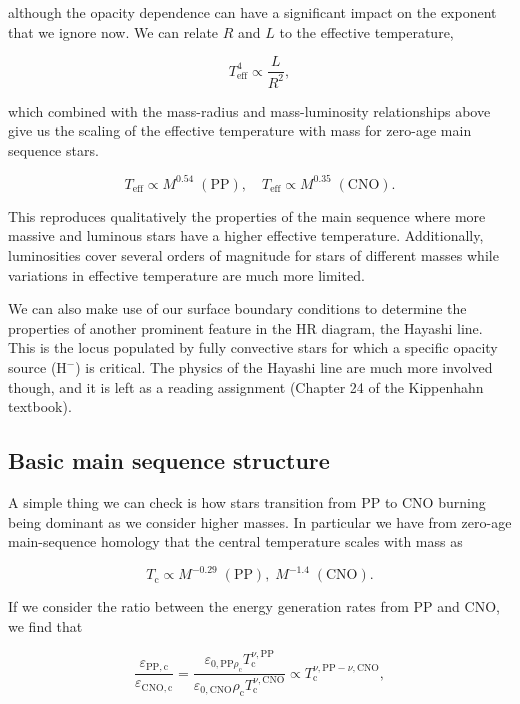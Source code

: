 \documentclass[twocolumn]{article}
\begin{document}
although the opacity dependence can have a significant impact on the
exponent that we ignore now. We can relate \(R\) and \(L\) to the
effective temperature,

\[T_\mathrm{eff}^4 \propto \frac{L}{R^2},\]

which combined with the mass-radius and mass-luminosity relationships
above give us the scaling of the effective temperature with mass for
zero-age main sequence stars.

\[T_\mathrm{eff}\propto M^{0.54}\;\mathrm{(PP)},\quad T_\mathrm{eff}\propto M^{0.35}\;\mathrm{(CNO)}.\]

This reproduces qualitatively the properties of the main sequence where
more massive and luminous stars have a higher effective temperature.
Additionally, luminosities cover several orders of magnitude for stars
of different masses while variations in effective temperature are much
more limited.

We can also make use of our surface boundary conditions to determine the
properties of another prominent feature in the HR diagram, the Hayashi
line. This is the locus populated by fully convective stars for which a
specific opacity source (\(\mathrm{H}^{-}\)) is critical. The physics of
the Hayashi line are much more involved though, and it is left as a
reading assignment (Chapter 24 of the Kippenhahn textbook).

\hypertarget{basic-main-sequence-structure}{%
\subsection{Basic main sequence
structure}\label{basic-main-sequence-structure}}

A simple thing we can check is how stars transition from PP to CNO
burning being dominant as we consider higher masses. In particular we
have from zero-age main-sequence homology that the central temperature
scales with mass as

\[T_\mathrm{c}\propto M^{-0.29}\;\mathrm{(PP)},\;M^{-1.4}\;\mathrm{(CNO)}.\]

If we consider the ratio between the energy generation rates from PP and
CNO, we find that

\[\frac{\varepsilon_{\mathrm{PP,c}}}{\varepsilon_{\mathrm{CNO,c}}}=\frac{\varepsilon_{\mathrm{0,PP}\rho_\mathrm{c}}T_\mathrm{c}^{\nu,\mathrm{PP}}}{\varepsilon_{\mathrm{0,CNO}}\rho_\mathrm{c}T_\mathrm{c}^{\nu,\mathrm{CNO}}}\propto T_\mathrm{c}^{\nu,\mathrm{PP}- \nu,\mathrm{CNO}},\tag{8.4}\]
\end{document}
